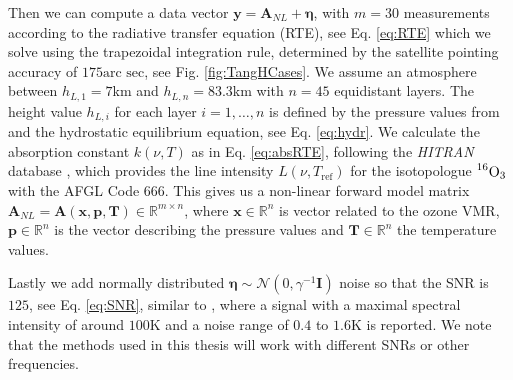 Then we can compute a data vector $\bm{y} = \bm{A}_{NL} + \bm{\eta} $, with $m = 30$ measurements according to the radiative transfer equation (RTE), see Eq. \ref{eq:RTE} which we solve using the trapezoidal integration rule, determined by the satellite pointing accuracy of $175\text{arc sec}$, see Fig. \ref{fig:TangHCases}.
We assume an atmosphere between $h_{L,1}=7$km and $h_{L,n} = 83.3$km with $n = 45$ equidistant layers.
The height value $h_{L,i}$ for each layer $i = 1,\dots, n$ is defined by the pressure values from \cite{MLSdata} and the hydrostatic equilibrium equation, see Eq. \ref{eq:hydr}.
We calculate the absorption constant $k(\nu,T)$ as in Eq. \ref{eq:absRTE}, following the \textit{HITRAN} database \cite{gordon2022hitran2020}, which provides the line intensity $L(\nu,T_{\text{ref}})$ for the isotopologue $\prescript{16}{}{\text{O}}_3$ with the AFGL Code 666.
This gives us a non-linear forward model matrix $\bm{A}_{NL} = \bm{A}(\bm{x}, \bm{p}, \bm{T}) \in \mathbb{R}^{m \times n}$, where $\bm{x}\in \mathbb{R}^{n}$ is vector related to the ozone VMR, $\bm{p}\in \mathbb{R}^{n}$ is the vector describing the pressure values and $\bm{T}\in \mathbb{R}^{n}$ the temperature values.

Lastly we add normally distributed $\bm{\eta} \sim \mathcal{N}(0,\gamma^{-1} \bm{I})$ noise so that the SNR is $125$, see Eq. \ref{eq:SNR}, similar to \cite{Froidevaux2008snrozone}, where a signal with a maximal spectral intensity of around $100\text{K}$ and a noise range of $0.4$ to $1.6\text{K}$ is reported.
We note that the methods used in this thesis will work with different SNRs or other frequencies.

